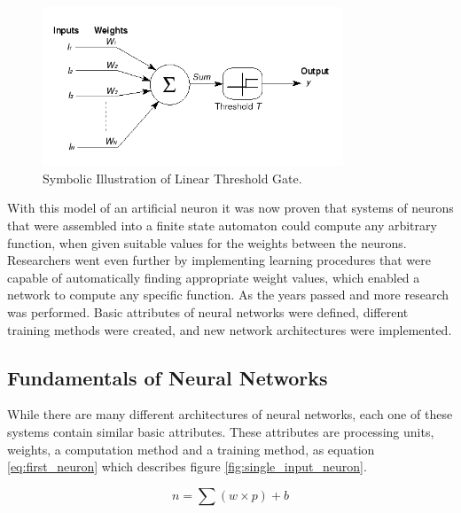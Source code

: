 \documentclass[12pt, a4paper, twoside]{report}
\begin{document}
\begin{figure}[ht]
	\centering
	\includegraphics[width=0.8\textwidth]
	{images/chapter4/artificial_neuron}
	\caption{Symbolic Illustration of Linear Threshold Gate.}
	\label{fig:artificial_neuron}
\end{figure}

With this model of an artificial neuron it was now proven that systems of neurons that were assembled into a finite state automaton could compute any arbitrary function, when given suitable values for the weights between the neurons. Researchers went even further by implementing learning procedures that were capable of automatically finding appropriate weight values, which enabled a network to compute any specific function. As the years passed and more research was performed. Basic attributes of neural networks were defined, different training methods were created, and new network architectures were implemented.

\subsection{Fundamentals of Neural Networks}
While there are many different architectures of neural networks, each one of these systems contain similar basic attributes. These attributes are processing units, weights, a computation method and a training method, as equation \ref{eq:first_neuron}  which describes figure \ref{fig:single_input_neuron}.

\begin{equation}
n = \sum (w \times p) + b
\label{eq:first_neuron}
\end{equation}
\end{document}
